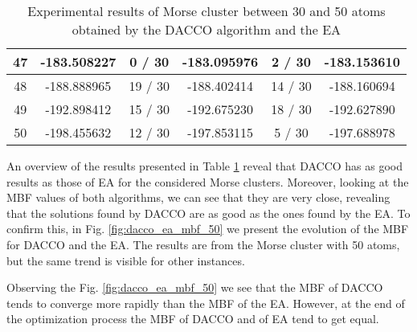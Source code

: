 \begin{table}[!htdp]
\begin{center}
\begin{tabular}{| c | c | c | c | c | c |}
						47 & -183.508227 & 0 / 30 & -183.095976 & 2 / 30 & -183.153610 \\ \hline
						48 & -188.888965 & 19 / 30 & -188.402414 & 14 / 30 & -188.160694 \\ \hline
						49 & -192.898412 & 15 / 30 & -192.675230 & 18 / 30 & -192.627890 \\ \hline
						50 & -198.455632 & 12 / 30 & -197.853115 & 5 / 30 & -197.688978 \\ \hline
					\end{tabular}
				\end{center}
				\caption{Experimental results of Morse cluster between 30 and 50 atoms obtained by the DACCO algorithm and the EA}
				\label{tab:dacco_vs_ea}
			\end{table}
			
			An overview of the results presented in Table \ref{tab:dacco_vs_ea} reveal that DACCO has as good results as those of EA for the considered Morse clusters. Moreover, looking at the MBF values of both algorithms, we can see that they are very close, revealing that the solutions found by DACCO are as good as the ones found by the EA. To confirm this, in Fig. \ref{fig:dacco_ea_mbf_50} we present the evolution of the MBF for DACCO and the EA. The results are from the Morse cluster with 50 atoms, but the same trend is visible for other instances. 
			
			
			Observing the Fig. \ref{fig:dacco_ea_mbf_50} we see that the MBF of DACCO tends to converge more rapidly than the MBF of the EA. However, at the end of the optimization process the MBF of DACCO and of EA tend to get equal.
			
